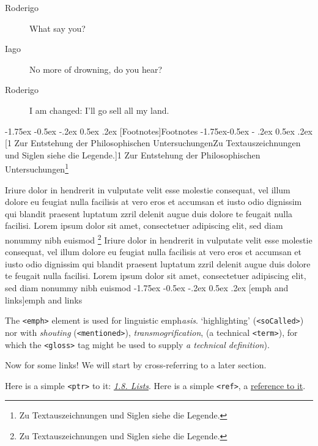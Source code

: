 \documentclass[11pt,twoside]{article}\makeatletter
\makeatletter
\renewcommand\section{\@startsection {section}{1}{\z@}%
     {-1.75ex \@plus -0.5ex \@minus -.2ex}%
     {0.5ex \@plus .2ex}%
     {\reset@font\Large\bfseries\sffamily}}
\renewcommand\subsection{\@startsection{subsection}{2}{\z@}%
     {-1.75ex\@plus -0.5ex \@minus- .2ex}%
     {0.5ex \@plus .2ex}%
     {\reset@font\Large\sffamily}}
\renewcommand\subsubsection{\@startsection{subsubsection}{3}{\z@}%
     {-1.5ex\@plus -0.35ex \@minus -.2ex}%
     {0.5ex \@plus .2ex}%
     {\reset@font\large\sffamily}}
\def\DivII{\subsection}
\def\DivIII{\subsubsection}
\def\DivII{\section}
\def\DivIII{\subsection}
\makeatother
\begin{document}
 \begin{description} \item[Roderigo] 

What say you?\end{description}
 \begin{description} \item[Iago] 

No more of drowning, do you hear?\end{description}
 \begin{description} \item[Roderigo] 

I am changed: I'll go sell all my land.\end{description}

\DivII[Footnotes]{Footnotes}
\DivIII[1 Zur Entstehung der Philosophischen UntersuchungenZu Textauszeichnungen und Siglen siehe die Legende.]{1 Zur Entstehung der {Philosophischen  	Untersuchungen}\footnote{Zu Textauszeichnungen und  	Siglen siehe die Legende.}}\par
Iriure dolor in hendrerit in vulputate velit esse molestie       consequat, vel illum dolore eu feugiat nulla facilisis at vero eros et       accumsan et iusto odio dignissim qui blandit praesent luptatum zzril       delenit augue duis dolore te feugait nulla facilisi. Lorem ipsum dolor       sit amet, consectetuer adipiscing elit, sed diam nonummy nibh euismod 	\footnote{Zu  	Textauszeichnungen und Siglen siehe die Legende.}       Iriure dolor in hendrerit in vulputate velit esse molestie       consequat, vel illum dolore eu feugiat nulla facilisis at vero eros et       accumsan et iusto odio dignissim qui blandit praesent luptatum zzril       delenit augue duis dolore te feugait nulla facilisi. Lorem ipsum dolor       sit amet, consectetuer adipiscing elit, sed diam nonummy nibh euismod
\DivII[emph and links]{emph and links}\par
The \texttt{<emph>} element is used for linguistic           emph\textit{asis}.  ‘highlighting’           (\texttt{<soCalled>}) nor with \emph{shouting}           (\texttt{<mentioned>}), \emph{transmogrification}, (a           technical \texttt{<term>}), for which the \texttt{<gloss>} tag           might be used to supply  \textit{a technical           definition}).\par
Now for some links! We will start by cross-referring to a later section.\par
Here is a simple             \texttt{<ptr>}             to it:             \textit{\hyperref[P1]{1.8. Lists}}. Here is a simple             \texttt{<ref>}, a             \hyperlink{P1}{reference to it}.\par
\end{document}

